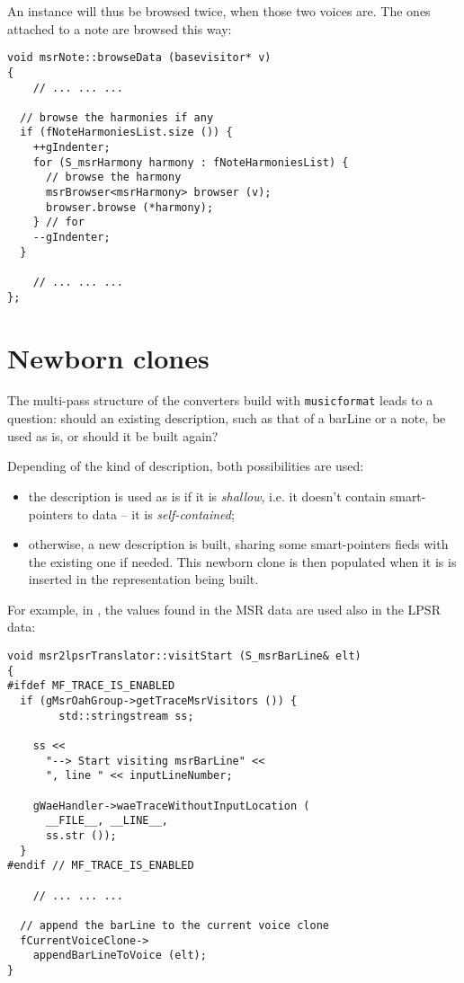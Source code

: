 An  instance will thus be browsed twice, when those two voices are. The ones attached to a note are browsed this way:
\begin{lstlisting}[language=CPlusPlus]
void msrNote::browseData (basevisitor* v)
{
	// ... ... ...

  // browse the harmonies if any
  if (fNoteHarmoniesList.size ()) {
    ++gIndenter;
    for (S_msrHarmony harmony : fNoteHarmoniesList) {
      // browse the harmony
      msrBrowser<msrHarmony> browser (v);
      browser.browse (*harmony);
    } // for
    --gIndenter;
  }

	// ... ... ...
};
\end{lstlisting}


\section{Newborn clones}

The multi-pass structure of the converters build with {\tt musicformat} leads to a question: should an existing description, such as that of a barLine or a note, be used as is, or should it be built again?

Depending of the kind of description, both possibilities are used:
\begin{itemize}
\item the description is used as is if it is {\it shallow}, i.e. it doesn't contain smart-pointers to data -- it is {\it self-contained};
\item otherwise, a new description is built, sharing some smart-pointers fieds with the existing one if needed. This newborn clone is then populated when it is is inserted in the representation being built.
\end{itemize}

For example, in \msrToLpsr{}, the  values found in the MSR data are used also in the LPSR data:
\begin{lstlisting}[language=CPlusPlus]
void msr2lpsrTranslator::visitStart (S_msrBarLine& elt)
{
#ifdef MF_TRACE_IS_ENABLED
  if (gMsrOahGroup->getTraceMsrVisitors ()) {
		std::stringstream ss;

    ss <<
      "--> Start visiting msrBarLine" <<
      ", line " << inputLineNumber;

    gWaeHandler->waeTraceWithoutInputLocation (
      __FILE__, __LINE__,
      ss.str ());
  }
#endif // MF_TRACE_IS_ENABLED

	// ... ... ...

  // append the barLine to the current voice clone
  fCurrentVoiceClone->
    appendBarLineToVoice (elt);
}
\end{lstlisting}

